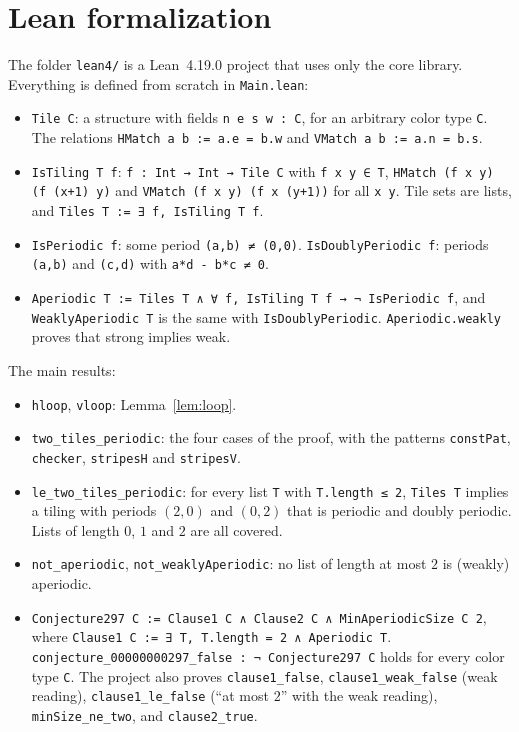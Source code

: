 \documentclass[11pt]{article}
\theoremstyle{definition}
\theoremstyle{remark}
\begin{document}
\section{Lean formalization}
The folder \texttt{lean4/} is a Lean~4.19.0 project that uses only the core
library. Everything is defined from scratch in \texttt{Main.lean}:
\begin{itemize}
\item \texttt{Tile C}: a structure with fields \texttt{n e s w : C}, for an
arbitrary color type \texttt{C}. The relations \texttt{HMatch a b :=
a.e = b.w} and \texttt{VMatch a b := a.n = b.s}.
\item \texttt{IsTiling T f}: \texttt{f : Int → Int → Tile C} with
\texttt{f x y ∈ T}, \texttt{HMatch (f x y) (f (x+1) y)} and
\texttt{VMatch (f x y) (f x (y+1))} for all \texttt{x y}. Tile sets are lists,
and \texttt{Tiles T := ∃ f, IsTiling T f}.
\item \texttt{IsPeriodic f}: some period \texttt{(a,b) ≠ (0,0)}.
\texttt{IsDoublyPeriodic f}: periods \texttt{(a,b)} and \texttt{(c,d)} with
\texttt{a*d - b*c ≠ 0}.
\item \texttt{Aperiodic T := Tiles T ∧ ∀ f, IsTiling T f → ¬ IsPeriodic f}, and
\texttt{WeaklyAperiodic T} is the same with \texttt{IsDoublyPeriodic}.
\texttt{Aperiodic.weakly} proves that strong implies weak.
\end{itemize}
The main results:
\begin{itemize}
\item \texttt{hloop}, \texttt{vloop}: Lemma~\ref{lem:loop}.
\item \texttt{two\_tiles\_periodic}: the four cases of the proof, with the
patterns \texttt{constPat}, \texttt{checker}, \texttt{stripesH} and \texttt{stripesV}.
\item \texttt{le\_two\_tiles\_periodic}: for every list \texttt{T} with
\texttt{T.length ≤ 2}, \texttt{Tiles T} implies a tiling with periods
$(2,0)$ and $(0,2)$ that is periodic and doubly periodic. Lists of length $0$,
$1$ and $2$ are all covered.
\item \texttt{not\_aperiodic}, \texttt{not\_weaklyAperiodic}: no list of length
at most $2$ is (weakly) aperiodic.
\item \texttt{Conjecture297 C := Clause1 C ∧ Clause2 C ∧ MinAperiodicSize C 2},
where \texttt{Clause1 C := ∃ T, T.length = 2 ∧ Aperiodic T}.
\texttt{conjecture\_00000000297\_false : ¬ Conjecture297 C} holds for every color
type \texttt{C}. The project also proves
\texttt{clause1\_false}, \texttt{clause1\_weak\_false}
(weak reading), \texttt{clause1\_le\_false} (``at most $2$'' with the weak
reading), \texttt{minSize\_ne\_two}, and \texttt{clause2\_true}.
\end{itemize}
\end{document}
